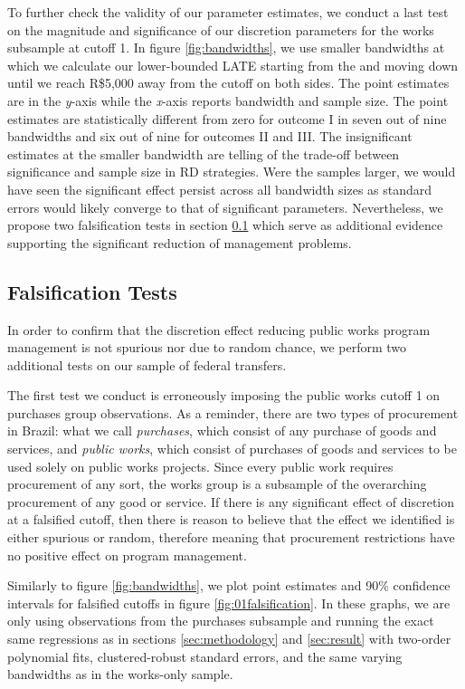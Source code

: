 \documentclass[11pt]{article}
\begin{document}
To further check the validity of our parameter estimates, we conduct a last test on the magnitude and significance of our discretion parameters for the works subsample at cutoff 1. In figure \ref{fig:bandwidths}, we use smaller bandwidths at which we calculate our lower-bounded LATE starting from the \citet{CalonicoOptimalDataDrivenRegression2015} and moving down until we reach R\$5,000 away from the cutoff on both sides. The point estimates are in the \emph{y}-axis while the \emph{x}-axis reports bandwidth and sample size. The point estimates are statistically different from zero for outcome I in seven out of nine bandwidths and six out of nine for outcomes II and III. The insignificant estimates at the smaller bandwidth are telling of the trade-off between significance and sample size in RD strategies. Were the samples larger, we would have seen the significant effect persist across all bandwidth sizes as standard errors would likely converge to that of significant parameters. Nevertheless, we propose two falsification tests in section \ref{subsec:discussion} which serve as additional evidence supporting the significant reduction of management problems.

\subsection{Falsification Tests} \label{subsec:discussion}

In order to confirm that the discretion effect reducing public works program management is not spurious nor due to random chance, we perform two additional tests on our sample of federal transfers.

The first test we conduct is erroneously imposing the public works cutoff 1 on  purchases group observations. As a reminder, there are two types of procurement in Brazil: what we call \emph{purchases}, which consist of any purchase of goods and services, and \emph{public works}, which consist of purchases of goods and services to be used solely on public works projects. Since every public work requires procurement of any sort, the works group is a subsample of the overarching procurement of any good or service. If there is any significant effect of discretion at a falsified cutoff, then there is reason to believe that the effect we identified is either spurious or random, therefore meaning that procurement restrictions have no positive effect on program management.

Similarly to figure \ref{fig:bandwidths}, we plot point estimates and 90\% confidence intervals for falsified cutoffs in figure \ref{fig:01falsification}. In these graphs, we are only using observations from the purchases subsample and running the exact same regressions as in sections \ref{sec:methodology} and \ref{sec:result} with two-order polynomial fits, clustered-robust standard errors, and the same varying bandwidths as in the works-only sample.
\clearpage
\end{document}
